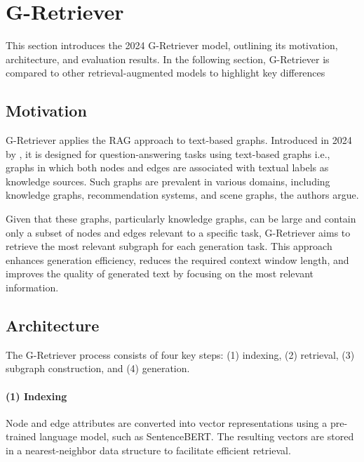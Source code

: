 \section{G-Retriever}

This section introduces the 2024 G-Retriever model, outlining its motivation, architecture, and evaluation results.
In the following section, G-Retriever is compared to other retrieval-augmented models to highlight key differences

\subsection{Motivation}
G-Retriever applies the RAG approach to text-based graphs.
Introduced in 2024 by \cite{g-retriever}, it is designed for question-answering tasks using text-based graphs \textemdash{} i.e., graphs in which both nodes and edges are associated with textual labels \textemdash{} as knowledge sources. Such graphs are prevalent in various domains, including knowledge graphs, recommendation systems, and scene graphs, the authors argue.

Given that these graphs, particularly knowledge graphs, can be large and contain only a subset of nodes and edges relevant to a specific task, G-Retriever aims to retrieve the most relevant subgraph for each generation task.
This approach enhances generation efficiency, reduces the required context window length, and improves the quality of generated text by focusing on the most relevant information.

\subsection{Architecture}

The G-Retriever process consists of four key steps: (1) indexing, (2) retrieval, (3) subgraph construction, and (4) generation.

\paragraph{(1) Indexing} Node and edge attributes are converted into vector representations using a pre-trained language model, such as SentenceBERT. The resulting vectors are stored in a nearest-neighbor data structure to facilitate efficient retrieval.

